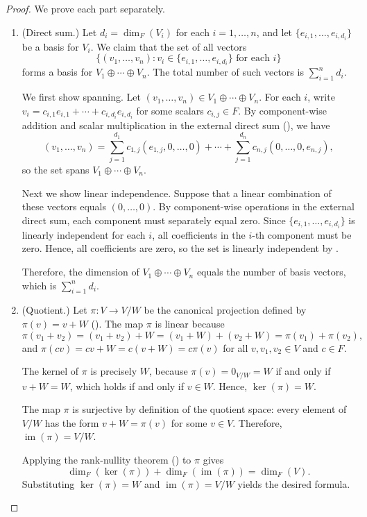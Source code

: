 \begin{proof}
    We prove each part separately.

    \begin{enumerate}
        \item (Direct sum.) Let $d_i = \dim_F(V_i)$ for each $i = 1, \dots, n$, and let $\{e_{i,1}, \dots, e_{i,d_i}\}$ be a basis for $V_i$. We claim that the set of all vectors
        $$\{(v_1, \dots, v_n) : v_i \in \{e_{i,1}, \dots, e_{i,d_i}\} \text{ for each } i\}$$
        forms a basis for $V_1 \oplus \cdots \oplus V_n$. The total number of such vectors is $\sum_{i=1}^n d_i$.

        We first show spanning. Let $(v_1, \dots, v_n) \in V_1 \oplus \cdots \oplus V_n$. For each $i$, write $v_i = c_{i,1}e_{i,1} + \cdots + c_{i,d_i}e_{i,d_i}$ for some scalars $c_{i,j} \in F$. By component-wise addition and scalar multiplication in the external direct sum (), we have
        $$(v_1, \dots, v_n) = \sum_{j=1}^{d_1} c_{1,j}(e_{1,j}, 0, \dots, 0) + \cdots + \sum_{j=1}^{d_n} c_{n,j}(0, \dots, 0, e_{n,j}),$$
        so the set spans $V_1 \oplus \cdots \oplus V_n$.

        Next we show linear independence. Suppose that a linear combination of these vectors equals $(0, \dots, 0)$. By component-wise operations in the external direct sum, each component must separately equal zero. Since $\{e_{i,1}, \dots, e_{i,d_i}\}$ is linearly independent for each $i$, all coefficients in the $i$-th component must be zero. Hence, all coefficients are zero, so the set is linearly independent by .

        Therefore, the dimension of $V_1 \oplus \cdots \oplus V_n$ equals the number of basis vectors, which is $\sum_{i=1}^n d_i$.

        \item (Quotient.) Let $\pi: V \to V/W$ be the canonical projection defined by $\pi(v) = v + W$ (). The map $\pi$ is linear because
        $$\pi(v_1 + v_2) = (v_1 + v_2) + W = (v_1 + W) + (v_2 + W) = \pi(v_1) + \pi(v_2),$$
        and $\pi(cv) = cv + W = c(v + W) = c\pi(v)$ for all $v, v_1, v_2 \in V$ and $c \in F$.

        The kernel of $\pi$ is precisely $W$, because $\pi(v) = 0_{V/W} = W$ if and only if $v + W = W$, which holds if and only if $v \in W$. Hence, $\ker(\pi) = W$.

        The map $\pi$ is surjective by definition of the quotient space: every element of $V/W$ has the form $v + W = \pi(v)$ for some $v \in V$. Therefore, $\operatorname{im}(\pi) = V/W$.

        Applying the rank-nullity theorem () to $\pi$ gives
        $$\dim_F(\ker(\pi)) + \dim_F(\operatorname{im}(\pi)) = \dim_F(V).$$
        Substituting $\ker(\pi) = W$ and $\operatorname{im}(\pi) = V/W$ yields the desired formula.
    \end{enumerate}
\end{proof}
